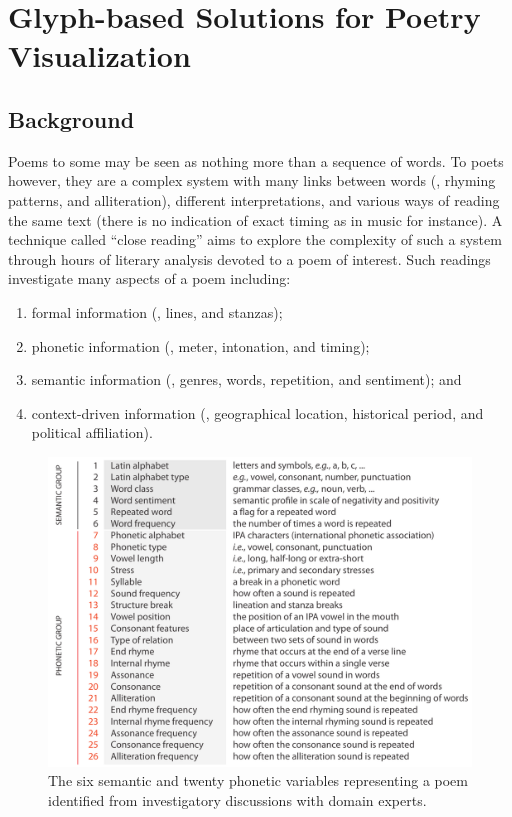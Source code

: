 \section{Glyph-based Solutions for Poetry Visualization}
\label{sec:poetry}

\subsection{Background}
Poems to some may be seen as nothing more than a sequence of words.
To poets however, they are a complex system with many links between words (\eg, rhyming patterns, and alliteration), different interpretations, and various ways of reading the same text (there is no indication of exact timing as in music for instance).
A technique called ``close reading'' aims to explore the complexity of such a system through hours of literary analysis devoted to a poem of interest. 
Such readings investigate many aspects of a poem including: 
\begin{enumerate}
	\item formal information (\eg, lines, and stanzas);
	\vspace{-2mm}
	\item phonetic information (\eg, meter, intonation, and timing);
	\vspace{-2mm}
	\item semantic information (\eg, genres, words, repetition, and sentiment); and
	\vspace{-2mm}
	\item context-driven information (\eg, geographical location, historical period, and political affiliation).
\end{enumerate}

\begin{figure}[b!]
\centering
\includegraphics[width=\textwidth]{images/other_glyphs/poem_glyph_vars}
\caption{The six semantic and twenty phonetic variables representing a poem identified from investigatory discussions with domain experts.}
\label{fig:poem_glyph_vars}
\end{figure}


